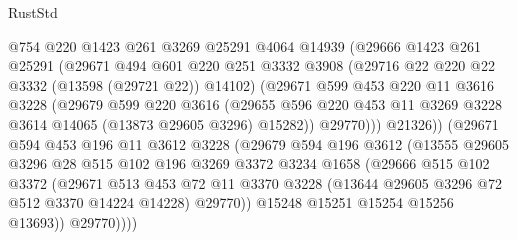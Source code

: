 \begin{lexlean}{RustStd}
\begin{coremodule}
                    @754
                    @220
                    @1423
                    @261
                    @3269
                    @25291
                    @4064
                    @14939
                    (@29666
                      @1423
                      @261
                      @25291
                      (@29671
                        @494
                        @601
                        @220
                        @251
                        @3332
                        @3908
                        (@29716 @22 @220 @22 @3332 (@13598 (@29721 @22)) @14102)
                        (@29671
                          @599
                          @453
                          @220
                          @11
                          @3616
                          @3228
                          (@29679
                            @599
                            @220
                            @3616
                            (@29655
                              @596
                              @220
                              @453
                              @11
                              @3269
                              @3228
                              @3614
                              @14065
                              (@13873 @29605 @3296)
                              @15282))
                          @29770)))
                    @21326))
                (@29671
                  @594
                  @453
                  @196
                  @11
                  @3612
                  @3228
                  (@29679
                    @594
                    @196
                    @3612
                    (@13555
                      @29605
                      @3296
                      @28
                      @515
                      @102
                      @196
                      @3269
                      @3372
                      @3234
                      @1658
                      (@29666
                        @515
                        @102
                        @3372
                        (@29671
                          @513
                          @453
                          @72
                          @11
                          @3370
                          @3228
                          (@13644 @29605 @3296 @72 @512 @3370 @14224 @14228)
                          @29770))
                      @15248
                      @15251
                      @15254
                      @15256
                      @13693))
                  @29770))))

\end{coremodule}
\end{lexlean}
